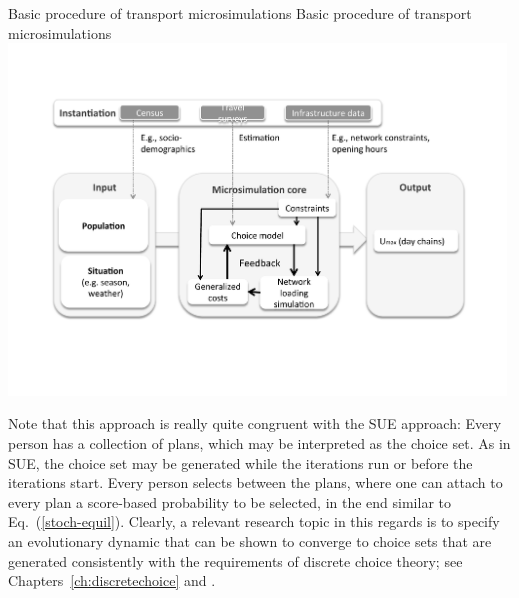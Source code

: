 \createfigure%
{Basic procedure of transport microsimulations}%
{Basic procedure of transport microsimulations
}%
{\label{fig:maxUtf}}%
{\includegraphics[width=0.99\textwidth, angle=0]{understanding/figures/maxUtf.pdf}}%
{}

Note that this approach is really quite congruent with the SUE
approach: Every person has a collection of plans, which may be
interpreted as the choice set.  As in SUE, the choice set may be
generated while the iterations run or before the iterations start.
Every person selects between the plans, where one can attach to
every plan a score-based probability to be selected, 
in the end similar to Eq.~(\ref{stoch-equil}).
Clearly, a relevant research topic in this regards is to specify 
an evolutionary dynamic that can be shown to converge to choice sets
that are generated consistently with the requirements of discrete
choice theory; see Chapters~\ref{ch:discretechoice} and 
.



